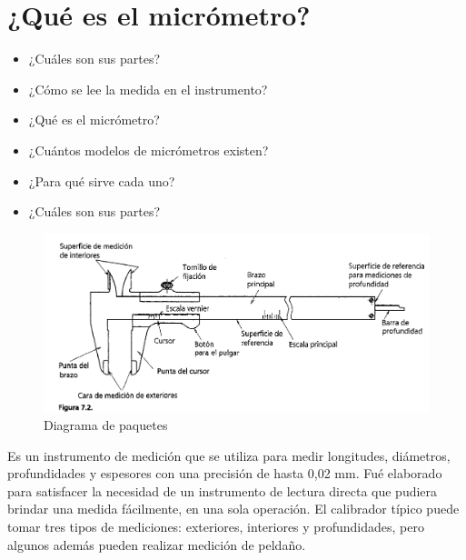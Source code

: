 \documentclass{article}
\theoremstyle{mytheoremstyle}
\theoremstyle{mytheoremstyle}
\theoremstyle{myproblemstyle}
\begin{document}
\section{¿Qué es el micrómetro?}
\begin{itemize}
	\item ¿Cuáles son sus partes?

	\item¿Cómo se lee la medida en el instrumento?

	\item¿Qué es el micrómetro?

	\item¿Cuántos modelos de micrómetros existen?

	\item¿Para qué sirve cada uno?

	\item¿Cuáles son sus partes?
\end{itemize}

\newpage

\begin{figure}[H]
	\centering
	\includegraphics[width=1\textwidth]{partes_vernier.png}
	\caption{Diagrama de paquetes}
	\label{fig:imagen2}
\end{figure}
Es un instrumento de medición que se utiliza para medir longitudes, diámetros, profundidades
y espesores con una precisión de hasta 0,02 mm. Fué elaborado para satisfacer la necesidad
de un instru­mento de lectura directa que pudiera brindar una medida fácilmente, en una sola
operación. El calibrador típico puede tomar tres tipos de mediciones: exteriores,
interiores y profundidades, pero algunos además pueden realizar medición de peldaño.
\end{document}
